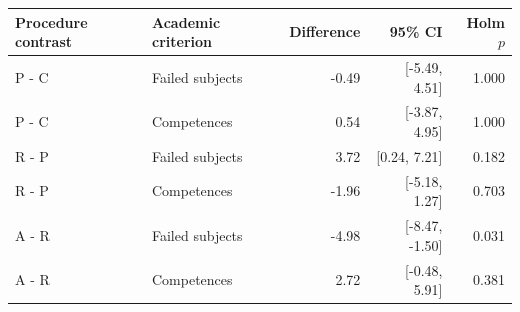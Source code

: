 \begin{tabular}{@{}llrrr@{}}
\toprule
Procedure contrast & Academic criterion & Difference & 95\% CI & Holm $p$ \\
\midrule
P - C & Failed subjects & -0.49 & [-5.49, 4.51] & 1.000 \\
P - C & Competences & 0.54 & [-3.87, 4.95] & 1.000 \\
R - P & Failed subjects & 3.72 & [0.24, 7.21] & 0.182 \\
R - P & Competences & -1.96 & [-5.18, 1.27] & 0.703 \\
A - R & Failed subjects & -4.98 & [-8.47, -1.50] & 0.031 \\
A - R & Competences & 2.72 & [-0.48, 5.91] & 0.381 \\
\bottomrule
\end{tabular}
